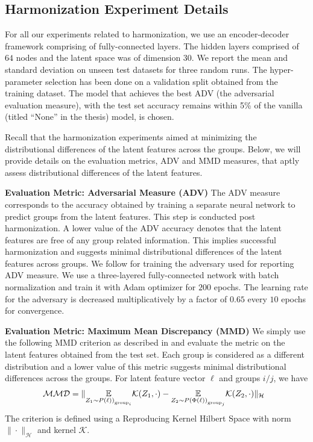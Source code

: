 \subsection{Harmonization Experiment Details}
For all our experiments related to harmonization, we use an encoder-decoder framework comprising of fully-connected layers. The hidden layers comprised of $64$ nodes and the latent space was of dimension $30$. We report the mean and standard deviation on unseen test datasets for three random runs. The hyper-parameter selection has been done on a validation split obtained from the training dataset. The model that achieves the best ADV (the adversarial evaluation measure), with the test set accuracy remains within 5\% of the vanilla (titled ``None'' in the thesis) model, is chosen. 

Recall that the harmonization experiments aimed at minimizing the distributional differences of the latent features across the groups. Below, we will provide details on the evaluation metrics, ADV and MMD measures, that aptly assess distributional differences of the latent features. 

{\bf Evaluation Metric: Adversarial Measure (ADV)}
The ADV measure corresponds to the accuracy obtained by training a separate neural network to predict groups from the latent features. This step is conducted post harmonization. A lower value of the ADV accuracy denotes that the latent features are free of any group related information. This implies successful harmonization and suggests minimal distributional differences of the latent features across groups. We follow \citep{cai} for training the adversary used for reporting ADV measure. We use a three-layered fully-connected network with batch normalization and train it with Adam optimizer for $200$ epochs. The learning rate for the adversary is decreased multiplicatively by a factor of $0.65$ every $10$ epochs for convergence. 


{\bf Evaluation Metric: Maximum Mean Discrepancy (MMD)}
We simply use the following MMD criterion as described in \citep{gretton2006kernel} and evaluate the metric on the latent features obtained from the test set. Each group is considered as a different distribution and a lower value of this metric suggests minimal distributional differences across the groups. For latent feature vector $\ell$ and groups $i/j$, we have 
\begin{align}
\label{mmd_eq}
    \hspace{-0.1in} \mathcal{MMD} = \|\underset{Z_1\sim P\left(\ell)\right)_{\text{group}_i}}{\EE} \mathcal{K}(Z_1, \cdot) - \underset{Z_2\sim P\left(\Phi(\ell)\right)_{\text{group}_j}}{\EE} \mathcal{K}(Z_2, \cdot)\|_{\mathcal{H}}
\end{align}
The criterion is defined using a Reproducing Kernel Hilbert Space with norm $\|\cdot\|_{\mathcal{H}}$ and kernel $\mathcal{K}$. 
